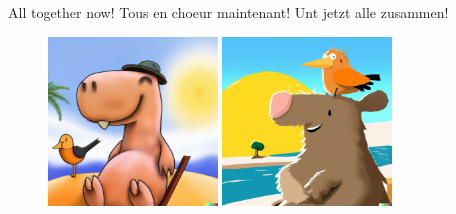 \documentclass{article}
\newcommand{\imagewidthfactor}{0.4}
\begin{document}
\centering
All together now!\linebreak
Tous en choeur maintenant!\linebreak
Unt jetzt alle zusammen!

\newpage %

\begin{figure}[h!]
\centering
\includegraphics[width=\imagewidthfactor\textwidth]{media/9a.png}
\quad
\includegraphics[width=\imagewidthfactor\textwidth]{media/9b.png}\\

\end{figure}
\end{document}
